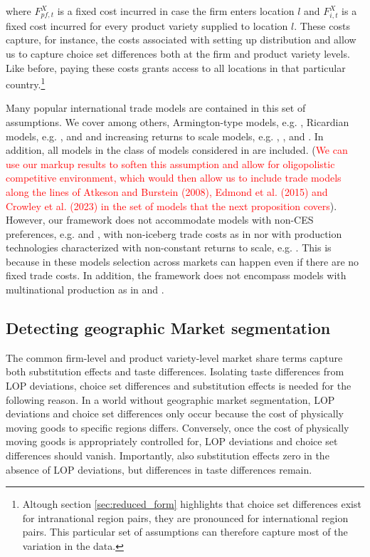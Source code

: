 where $F^X_{pf,t}$ is a fixed cost incurred in case the firm enters location $l$ and $F^X_{i,t}$ is a fixed cost incurred for every product variety supplied to location $l$. These costs capture, for instance, the costs associated with setting up distribution and allow us to capture choice set differences both at the firm and product variety levels. Like before, paying these costs grants access to all locations in that particular country.\footnote{Altough section \ref{sec:reduced_form} highlights that choice set differences exist for intranational region pairs, they are pronounced for international region pairs. This particular set of assumptions can therefore capture most of the variation in the data.}

Many popular international trade models are contained in this set of assumptions. We cover among others, Armington-type models, e.g. \citet{Anderson2003}, Ricardian models, e.g. \citet{Eaton2002}, \citet{Costinot2012} and \citet{Caliendo2015} and increasing returns to scale models, e.g. \citet{Krugman1980}, \citet{Melitz2003}, \citet{Melitz2015} and \citet{Antras2017}. In addition, all models in the class of models considered in \citet{Arkolakis2012} are included. (\textcolor{red}{We can use our markup results to soften this assumption and allow for oligopolistic competitive environment, which would then allow us to include trade models along the lines of Atkeson and Burstein (2008), Edmond et al. (2015) and Crowley et al. (2023) in the set of models that the next proposition covers}). However, our framework does not accommodate models with non-CES preferences, e.g. \citet{Fajgelbaum2016} and \citet{Arkolakis2019}, with non-iceberg trade costs as in \citet{Hummels2004} nor with production technologies characterized with non-constant returns to scale, e.g. \citet{Almunia2021}. This is because in these models selection across markets can happen even if there are no fixed trade costs. In addition, the framework does not encompass models with multinational production as in \citet{Helpman2004} and \citet{Tintelnot2016}.

\subsection{Detecting geographic Market segmentation}
The common firm-level and product variety-level market share terms capture both substitution effects and taste differences. Isolating taste differences from LOP deviations, choice set differences and substitution effects is needed for the following reason. In a world without geographic market segmentation, LOP deviations and choice set differences only occur because the cost of physically moving goods to specific regions differs. Conversely, once the cost of physically moving goods is appropriately controlled for, LOP deviations and choice set differences should vanish. Importantly, also substitution effects zero in the absence of LOP deviations, but differences in taste differences remain. 

